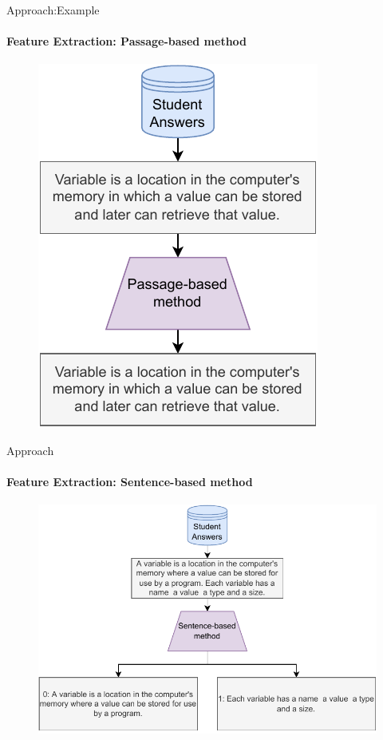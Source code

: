\documentclass[aspectratio=169]{beamer}
\begin{document}
\begin{frame}{Approach:Example}
\framesubtitle{Feature Extraction: Passage-based method}
\begin{figure}
\centering
\includegraphics[scale = 0.65]{images/passage_FE.pdf}
\label{fig:passage fe}
\end{figure}
\end{frame}
\begin{frame}{Approach}
\framesubtitle{Feature Extraction: Sentence-based method}
\begin{figure}
\centering
\includegraphics[scale = 0.65]{images/sentence_FE.pdf}
\label{fig:sentence fe}
\end{figure}
\end{frame}
\end{document}
